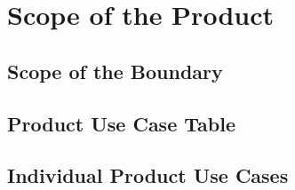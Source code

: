\section{Scope of the Product}
\subsection{Scope of the Boundary}
\subsection{Product Use Case Table}
\subsection{Individual Product Use Cases}